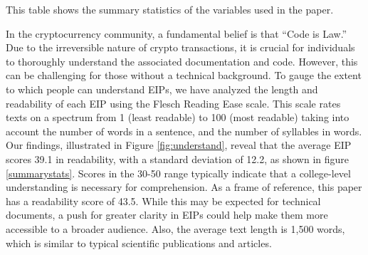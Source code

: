 \documentclass[No]{AEA}
\begin{document}
\begin{table}
    \caption{Summary Statistics}
     \begin{small}
    \begin{minipage}{\textwidth}
      This table shows the summary statistics of the variables used in the paper. 
  \end{minipage}
         \end{small}
    \makebox[\textwidth][c]{}
    \label{summarystats}

\end{table}



In the cryptocurrency community, a fundamental belief is that ``Code is Law.'' Due to the irreversible nature of crypto transactions, it is crucial for individuals to thoroughly understand the associated documentation and code. However, this can be challenging for those without a technical background. To gauge the extent to which people can understand EIPs, we have analyzed the length and readability of each EIP using the Flesch Reading Ease scale. This scale rates texts on a spectrum from 1 (least readable) to 100 (most readable) taking into account the number of words in a sentence, and the number of syllables in words. Our findings, illustrated in Figure \ref{fig:understand}, reveal that the average EIP scores 39.1 in readability, with a standard deviation of 12.2, as shown in figure \ref{summarystats}. Scores in the 30-50 range typically indicate that a college-level understanding is necessary for comprehension. As a frame of reference, this paper has a readability score of 43.5. While this may be expected for technical documents, a push for greater clarity in EIPs could help make them more accessible to a broader audience. Also, the average text length is 1,500 words, which is similar to typical scientific publications and articles. 
\end{document}
